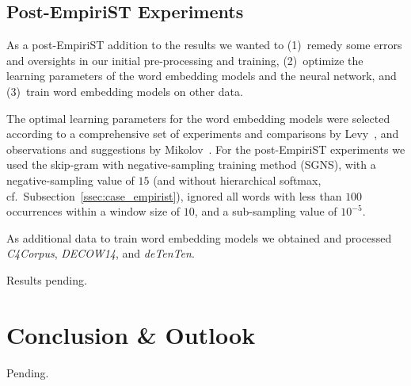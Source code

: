 \documentclass[11pt]{article}
\begin{document}
\subsection{Post-EmpiriST Experiments}
\label{ssec:case_postempirist}
As a post-EmpiriST addition to the results we wanted to (1)~remedy some errors
and oversights in our initial pre-processing and training, (2)~optimize the
learning parameters of the word embedding models and the neural network, and
(3)~train word embedding models on other data.

The optimal learning parameters for the word embedding models were selected
according to a comprehensive set of experiments and comparisons by
Levy~, and observations and suggestions by
Mikolov~. 
For the post-EmpiriST experiments we used the skip-gram with negative-sampling
training method (SGNS), with a negative-sampling value of $15$ (and without
hierarchical softmax, cf.~Subsection~\ref{ssec:case_empirist}), ignored all
words with less than $100$ occurrences within a window size of $10$, and a
sub-sampling value of $10^{-5}$. 

As additional data to train word embedding models we obtained and processed
\emph{C4Corpus}, \emph{DECOW14}, and \emph{deTenTen}.

\fxnote[inline]{}Results pending.


\section{Conclusion \& Outlook}
\label{sec:conclusion}

\fxnote[inline]{}Pending.


\clearpage
%
%



\end{document}
